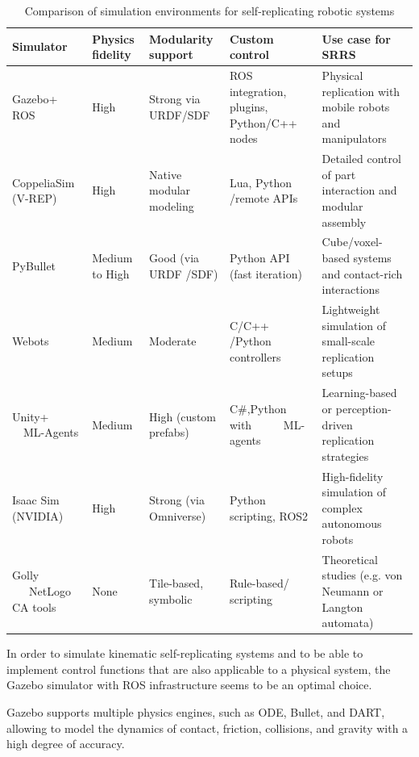\begin{table}[h!]
    \centering
    \begin{tabular}{|m{2cm}|m{1.5cm}|m{2cm}|m{2.5cm}|m{5cm}|}
        \hline
        \textbf{Simulator} & \textbf{Physics fidelity} & \textbf{Modularity support} &  \textbf{Custom control} & \textbf{Use case for SRRS} \\
        \hline
        Gazebo+ ROS &
        High &
        Strong via URDF/SDF &
        ROS integration, plugins, Python/C++ nodes &
        Physical replication with mobile robots and manipulators \\
        \hline
        CoppeliaSim (V-REP) &
        High &
        Native modular modeling &
        Lua, Python /remote APIs &
        Detailed control of part interaction and modular assembly \\
        \hline
        PyBullet &
        Medium to High &
        Good (via URDF /SDF) &
        Python API (fast iteration) &
        Cube/voxel-based systems and contact-rich interactions \\
        \hline
        Webots &
        Medium &
        Moderate &
        C/C++ /Python controllers &
        Lightweight simulation of small-scale replication setups \\
        \hline
        Unity+ \ \ ML-Agents &
        Medium &
        High (custom prefabs) &
        C\#,Python with \ \ \ \ \ ML-agents &
        Learning-based or perception-driven replication strategies \\
        \hline
        Isaac Sim (NVIDIA) &
        High &
        Strong (via Omniverse) &
        Python scripting, ROS2 &
        High-fidelity simulation of complex autonomous robots \\
        \hline
        Golly  \ \ \ NetLogo  CA tools &
        None &
        Tile-based, symbolic &
        Rule-based/ scripting &
        Theoretical studies (e.g. von Neumann or Langton automata) \\
        \hline
    \end{tabular}
    \caption{Comparison of simulation environments for self-replicating robotic systems}
    \label{tab:tools}
\end{table}

In order to simulate kinematic self-replicating systems and to be able to implement
control functions that are also applicable to a physical system, the Gazebo simulator 
with ROS infrastructure seems to be an optimal choice.

Gazebo supports multiple physics engines, such as 
ODE, Bullet, and DART, allowing to model the dynamics of contact,
friction, collisions, and gravity with a high degree of accuracy. 

